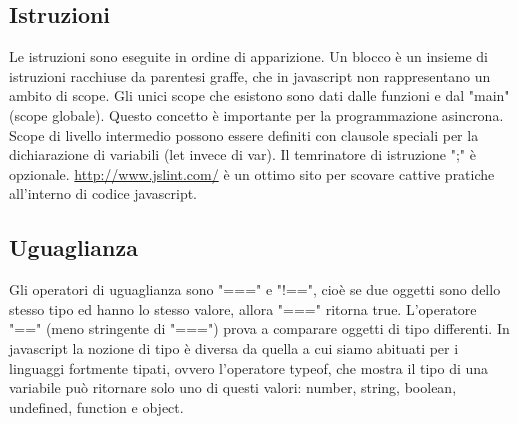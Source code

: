 \subsection{Istruzioni}
Le istruzioni sono eseguite in ordine di apparizione.\newline
\newline
Un blocco è un insieme di istruzioni racchiuse da parentesi graffe, che in javascript non rappresentano un ambito di scope. Gli unici scope che esistono sono dati dalle funzioni e dal "main" (scope globale). Questo concetto è importante per la programmazione asincrona.\newline
\newline
Scope di livello intermedio possono essere definiti con clausole speciali per la dichiarazione di variabili (let invece di var).\newline
\newline
Il temrinatore di istruzione ";" è opzionale.\newline
\newline
\url{http://www.jslint.com/} è un ottimo sito per scovare cattive pratiche all'interno di codice javascript.
\subsection{Uguaglianza}
Gli operatori di uguaglianza sono "===" e "!==", cioè se due oggetti sono dello stesso tipo ed hanno lo stesso valore, allora "===" ritorna true.\newline
\newline
L'operatore "==" (meno stringente di "===") prova a comparare oggetti di tipo differenti.\newline
\newline
In javascript la nozione di tipo è diversa da quella a cui siamo abituati per i linguaggi fortmente tipati, ovvero l'operatore typeof, che mostra il tipo di una variabile può ritornare solo uno di questi valori: number, string, boolean, undefined, function e object.